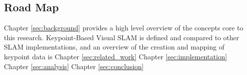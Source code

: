 \subsection{Road Map}

Chapter \ref{sec:background} provides a high level overview of the concepts core to this research. Keypoint-Based Visual SLAM is defined and compared to other SLAM implementations, and an overview of the creation and mapping of keypoint data is 
Chapter \ref{sec:related_work}
Chapter \ref{sec:implementation}
Chapter \ref{sec:analysis}
Chapter \ref{sec:conclusion}